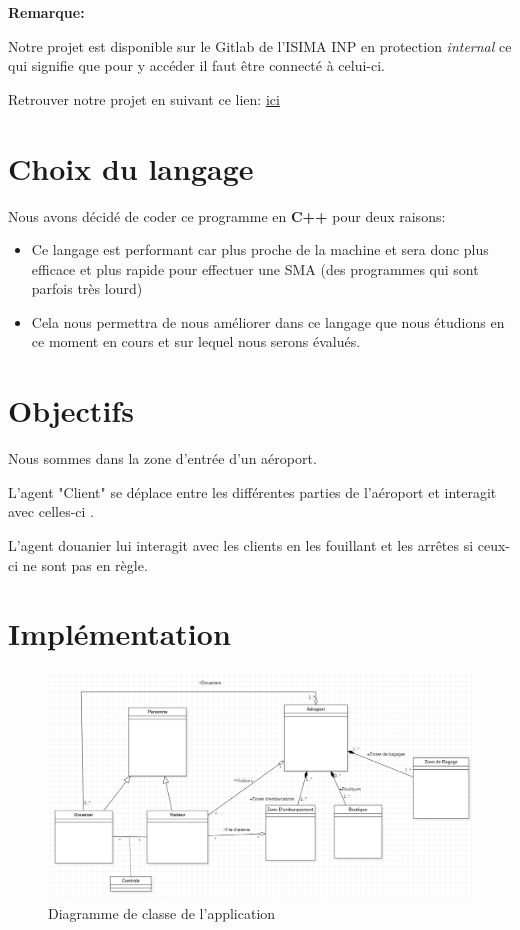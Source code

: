 \documentclass[12pt,french]{article} %
\begin{document}
 \bigskip
 
 \textbf{Remarque:}
 

Notre projet est disponible sur le Gitlab de l'ISIMA INP en protection \textit{internal} ce qui signifie que pour y accéder il faut être connecté à celui-ci.

Retrouver notre projet en suivant ce lien: \href{https://gitlab.isima.fr/liballejos/smairport}{ici}

\newpage

\section{Choix du langage}

Nous avons décidé de coder ce programme en \textbf{C++} pour deux raisons:

\medskip

\begin{itemize}
	\item Ce langage est performant car plus proche de la machine et sera donc plus efficace et plus rapide pour effectuer une SMA (des programmes qui sont parfois très lourd)
	
	\item Cela nous permettra de nous améliorer dans ce langage que nous étudions en ce moment en cours et sur lequel nous serons évalués.
\end{itemize}


\section{Objectifs}

Nous sommes dans la zone d'entrée d'un aéroport.

L'agent "Client" se déplace entre les différentes parties de l'aéroport et interagit avec celles-ci .

L'agent douanier lui interagit avec les clients en les fouillant et les arrêtes si ceux-ci ne sont pas en règle.


\section{Implémentation}


\begin{figure}[H]
	\centering
	\includegraphics[scale=0.4]{analyse.png}
	\caption{Diagramme de classe de l'application}    
\end{figure}
\end{document}
